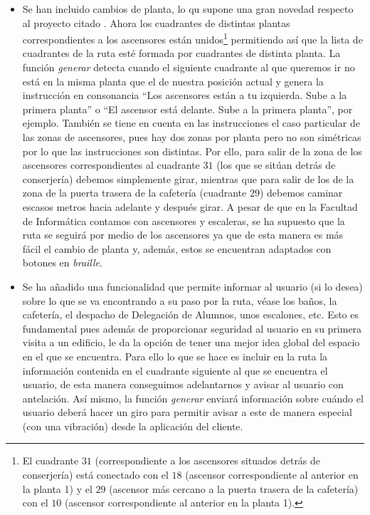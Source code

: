 \begin{itemize}
	
	\item Se han incluido cambios de planta, lo qu supone una gran novedad respecto al proyecto citado \cite{TFGguia}. Ahora los cuadrantes de distintas plantas correspondientes a los ascensores están unidos\footnote{El cuadrante $31$ (correspondiente a los ascensores situados detrás de conserjería) está conectado con el $18$ (ascensor correspondiente al anterior en la planta 1) y el $29$ (ascensor más cercano a la puerta trasera de la cafetería) con el $10$ (ascensor correspondiente al anterior en la planta 1).} permitiendo así que la lista de cuadrantes de la ruta esté formada por cuadrantes de distinta planta. La función \textit{generar} detecta cuando el siguiente cuadrante al que queremos ir no está en la misma planta que el de nuestra posición actual y genera la instrucción en consonancia ``Los ascensores están a tu izquierda. Sube a la primera planta'' o ``El ascensor está delante. Sube a la primera planta'', por ejemplo. También se tiene en cuenta en las instrucciones el caso particular de las zonas de ascensores, pues hay dos zonas por planta pero no son simétricas por lo que las instrucciones son distintas. Por ello, para salir de la zona de los ascensores correspondientes al cuadrante $31$ (los que se sitúan detrás de conserjería) debemos simplemente girar, mientras que para salir de los de la zona de la puerta trasera de la cafetería (cuadrante $29$) debemos caminar escasos metros hacia adelante y después girar. A pesar de que en la Facultad de Informática contamos con ascensores y escaleras, se ha supuesto que la ruta se seguirá por medio de los ascensores ya que de esta manera es más fácil el cambio de planta y, además, estos se encuentran adaptados con botones en \textit{braille}.
	
	\item Se ha añadido una funcionalidad que permite informar al usuario (si lo desea) sobre lo que se va encontrando a su paso por la ruta, véase los baños, la cafetería, el despacho de Delegación de Alumnos, unos escalones, etc. Esto es fundamental pues además de proporcionar seguridad al usuario en su primera visita a un edificio, le da la opción de tener una mejor idea global del espacio en el que se encuentra. Para ello lo que se hace es incluir en la ruta la información contenida en el cuadrante siguiente al que se encuentra el usuario, de esta manera conseguimos adelantarnos y avisar al usuario con antelación. Así mismo, la función \textit{generar} enviará información sobre cuándo el usuario deberá hacer un giro para permitir avisar a este de manera especial (con una vibración) desde la aplicación del cliente.
	
\end{itemize}



